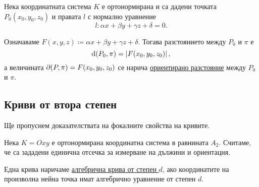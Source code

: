 \documentclass[numbers=endperiod, DIV=15]{scrartcl}
\begin{document}
\begin{theorem}
  Нека координатната система $K$ е ортонормирана и са дадени точката $P_0(x_0, y_0, z_0)$ и правата $l$ с нормално уравнение
  \begin{displaymath}
    l: \alpha x + \beta y + \gamma z + \delta = 0.
  \end{displaymath}

  Означаваме $F(x, y, z) \coloneqq \alpha x + \beta y + \gamma z + \delta$. Тогава разстоянието между $P_0$ и $\pi$ е
  \begin{displaymath}
    \operatorname{d}(P_0, \pi) = \left\vert F(x_0, y_0, z_0) \right\vert,
  \end{displaymath}
  а величината $\partial(P, \pi) = F(x_0, y_0, z_0)$ се нарича \underline{ориентирано разстояние} между $P_0$ и $\pi$.
\end{theorem}

\subsection{Криви от втора степен}

\begin{note}
  Ще пропуснем доказателствата на фокалните свойства на кривите.
\end{note}

Нека $K = Oxy$ е ортонормирана координатна система в равнината $A_2$. Считаме, че са зададени единична отсечка за измерване на дължини и ориентация.

\begin{definition}
  Една крива наричаме \underline{алгебрична крива от степен $d$}, ако координатите на произволна нейна точка имат алгебрично уравнение от степен $d$.
\end{definition}
\end{document}

